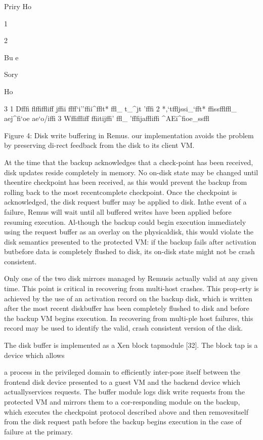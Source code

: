 Pri\Gamma \Delta ry
Ho\Theta \Lambda 

1

2

Bu
\Xi \Xi e
\Pi 

S\Sigma \Upsilon o\Phi \Psi \Delta ry

Ho\Theta \Lambda 

3
1 D\Omega fffi flffi\Omega ffliff jffii \Omega ffff`i''\Omega ffii^fflt* ffl_ t_^jt '\Omega fffi
2 *\Omega ,`tffljssi_`fft* ffissfflffl_ aej^fi`oe ae`o/iffi
3 Wffi\Omega ffliff ffiitijffi' ffl_ '\Omega fffijaffliffi ^AEi^fioe_\Omega ssffl

Figure 4: Disk write buffering in Remus.
our implementation avoids the problem by preserving di-rect feedback from the disk to its client VM.

At the time that the backup acknowledges that a check-point has been received, disk updates reside completely
in memory. No on-disk state may be changed until theentire checkpoint has been received, as this would prevent the backup from rolling back to the most recentcomplete checkpoint. Once the checkpoint is acknowledged, the disk request buffer may be applied to disk. Inthe event of a failure, Remus will wait until all buffered
writes have been applied before resuming execution. Al-though the backup could begin execution immediately
using the request buffer as an overlay on the physicaldisk, this would violate the disk semantics presented to
the protected VM: if the backup fails after activation butbefore data is completely flushed to disk, its on-disk state
might not be crash consistent.

Only one of the two disk mirrors managed by Remusis actually valid at any given time. This point is critical in recovering from multi-host crashes. This prop-erty is achieved by the use of an activation record on the
backup disk, which is written after the most recent diskbuffer has been completely flushed to disk and before the
backup VM begins execution. In recovering from multi-ple host failures, this record may be used to identify the
valid, crash consistent version of the disk.

The disk buffer is implemented as a Xen block tapmodule [32]. The block tap is a device which allows

a process in the privileged domain to efficiently inter-pose itself between the frontend disk device presented
to a guest VM and the backend device which actuallyservices requests. The buffer module logs disk write requests from the protected VM and mirrors them to a cor-responding module on the backup, which executes the
checkpoint protocol described above and then removesitself from the disk request path before the backup begins execution in the case of failure at the primary.

